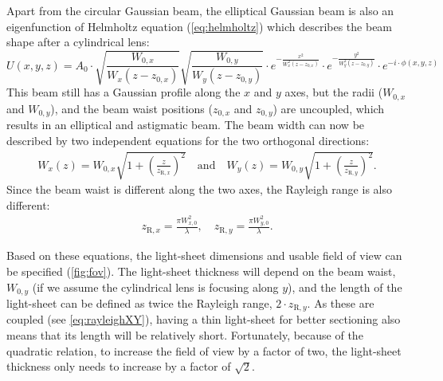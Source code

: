     Apart from the circular Gaussian beam, the elliptical Gaussian beam is also an eigenfunction of Helmholtz equation (\autoref{eq:helmholtz}) which describes the beam shape after a cylindrical lens:
    \begin{equation}
      U(x,y,z) = A_0 \cdot \sqrt{\frac{W_{0,x}}{W_x(z-z_{0,x})}} \sqrt{\frac{W_{0,y}}{W_y(z-z_{0,y})}} \cdot e^{-\frac{x^2}{W_x^2(z-z_{0,x})}} \cdot e^{-\frac{y^2}{W_y^2(z-z_{0,y})}} \cdot e^{-i\cdot \phi(x,y,z)}
    \end{equation}
    This beam still has a Gaussian profile along the $x$ and $y$ axes, but the radii ($W_{0,x}$ and $W_{0,y}$), and the beam waist positions ($z_{0,x}$ and $z_{0,y}$) are uncoupled, which results in an elliptical and astigmatic beam. The beam width can now be described by two independent equations for the two orthogonal directions:
    \begin{align}
      W_x(z) = W_{0,x}\sqrt{1+\left( \frac{z}{z_{\mathrm{R},x}} \right)^2}\mathrm{\quad and \quad } W_y(z) = W_{0,y}\sqrt{1+\left( \frac{z}{z_{\mathrm{R},y}} \right)^2}.
    \end{align}
    Since the beam waist is different along the two axes, the Rayleigh range is also different:
    \begin{align}
      z_{\mathrm{R},x} = \frac{\pi W_{x,0}^2}{\lambda}, \quad
      z_{\mathrm{R},y} = \frac{\pi W_{y,0}^2}{\lambda}.
      \label{eq:rayleighXY}
    \end{align}
    
    
    Based on these equations, the light-sheet dimensions and usable field of view can be specified (\autoref{fig:fov}). The light-sheet thickness will depend on the beam waist, $W_{0,y}$ (if we assume the cylindrical lens is focusing along $y$), and the length of the light-sheet can be defined as twice the Rayleigh range, $2 \cdot z_{\mathrm{R},y}$. As these are coupled (see \autoref{eq:rayleighXY}), having a thin light-sheet for better sectioning also means that its length will be relatively short. Fortunately, because of the quadratic relation, to increase the field of view by a factor of two, the light-sheet thickness only needs to increase by a factor of $\sqrt{2}$.

